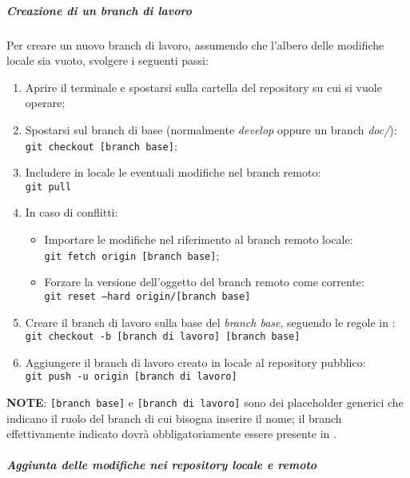 \subparagraph{Creazione di un branch di lavoro}
\label{spar:creazione_branch}

Per creare un nuovo branch di lavoro, assumendo che l'albero delle modifiche locale sia vuoto, svolgere i seguenti passi:
\begin{enumerate}
	\item Aprire il terminale e spostarsi sulla cartella del repository su cui si vuole operare;
	\item Spostarsi sul branch di base (normalmente \emph{develop} oppure un branch \emph{doc/}):\\
			\texttt{git checkout [branch base]};
	\item Includere in locale le eventuali modifiche nel branch remoto:\\
			\texttt{git pull}
	\item In caso di conflitti:
		\begin{itemize}
			\item Importare le modifiche nel riferimento al branch remoto locale:\\
					\texttt{git fetch origin [branch base]};
			\item Forzare la versione dell'oggetto del branch remoto come corrente:\\
					\texttt{git reset --hard origin/[branch base]}
		\end{itemize}
	\item Creare il branch di lavoro sulla base del \emph{branch base}, seguendo le regole in :\\
			\texttt{git checkout -b [branch di lavoro] [branch base]}
	\item Aggiungere il branch di lavoro creato in locale al repository pubblico:\\
			\texttt{git push -u origin [branch di lavoro]}
\end{enumerate}
\textbf{NOTE}: \texttt{[branch base]} e \texttt{[branch di lavoro]} sono dei placeholder generici che indicano il ruolo del branch di cui
bisogna inserire il nome; il branch effettivamente indicato dovrà obbligatoriamente essere presente in .

\subparagraph{Aggiunta delle modifiche nei repository locale e remoto}
\label{spar:aggiunta_modifiche}

